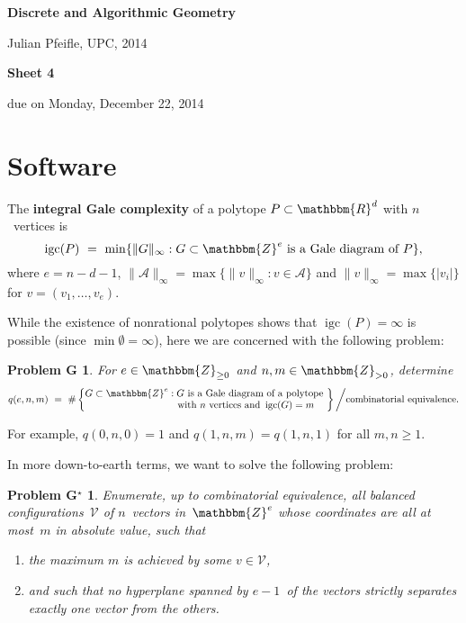 \documentclass[11pt]{amsart}
\newcommand{\R}{\mathbbm{R}}
\newcommand{\Z}{\mathbbm{Z}}
\newcommand{\VV}{\mathcal{V}}
\DeclareMathOperator{\igc}{igc}
\newcommand{\defn}[1]{\textbf{\color{blue}#1}} %
\newtheorem*{problemG}{Problem G}
\newtheorem*{problemG*}{Problem G$^\star$}
\begin{document}
\begin{center}
\textbf{\sffamily
   Discrete and Algorithmic Geometry }

\medskip
   Julian Pfeifle,
   UPC, 2014 \mbox{}
\end{center}

\bigskip

\begin{center}
  \textbf{\sffamily Sheet 4}

\bigskip
 due on Monday, December 22, 2014

\end{center}

\bigskip
\bigskip
\bigskip

\section*{Software}

The \defn{integral Gale complexity} of a polytope $P\subset\R^d$ with $n$~vertices is
\[
   \igc(P)
   \ = \
   \min\{\|G\|_\infty : G \subset\Z^e \text{ is a Gale diagram of } P\}, 
\]
where $e=n-d-1$, $\|\mathcal A\|_\infty = \max\{\|v\|_\infty : v\in\mathcal A\}$ and $\|v\|_\infty = \max\{|v_i|\}$ for $v=(v_1,\dots,v_e)$.

While the existence of nonrational polytopes shows that $\igc(P)=\infty$ is possible (since $\min\emptyset=\infty$), here we are concerned with the following problem:

\begin{problemG}
  For $e\in\Z_{\ge0}$ and $n, m\in\Z_{>0}$, determine 
  \[
     q(e,n,m)
     \ = \
     \#\left\{
     \begin{matrix}
       G\subset\Z^e : G \text{ is a Gale diagram of a polytope } \\
       \phantom{G\subset\Z^e}\!\!\text{with          $n$ vertices and } \igc(G)=m
     \end{matrix}
     \right\} \bigg/ \text{combinatorial equivalence}.
  \]
\end{problemG}

\noindent For example, $q(0,n,0) = 1$ and $q(1,n,m)=q(1,n,1)$ for all $m,n\ge1$. 

\bigskip
In more down-to-earth terms, we want to solve the following problem:

\begin{problemG*}
  Enumerate, up to combinatorial equivalence, all balanced   configurations~$\VV$ of $n$~vectors in~$\Z^e$ whose coordinates are   all at most~$m$ in absolute value, such that
\begin{enumerate}
\item the maximum $m$ is achieved by some $v\in\VV$, 
\item and such that no hyperplane spanned by $e-1$~of the vectors   strictly separates exactly one vector from the others.
\end{enumerate}
\end{problemG*}
\end{document}
